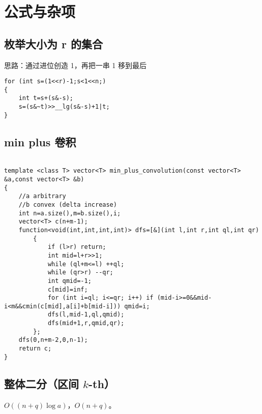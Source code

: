 \documentclass[12pt]{ctexart}
\begin{document}
\newpage

\section{公式与杂项}

\subsection{枚举大小为 r 的集合}

思路：通过进位创造 1，再把一串 1 移到最后

\begin{lstlisting}
for (int s=(1<<r)-1;s<1<<n;)
{
	int t=s+(s&-s);
	s=(s&~t)>>__lg(s&-s)+1|t;
}
\end{lstlisting}
\subsection{min plus 卷积}


\begin{lstlisting}

template <class T> vector<T> min_plus_convolution(const vector<T> &a,const vector<T> &b)
{
	//a arbitrary
	//b convex (delta increase)
	int n=a.size(),m=b.size(),i;
	vector<T> c(n+m-1);
	function<void(int,int,int,int)> dfs=[&](int l,int r,int ql,int qr)
		{
			if (l>r) return;
			int mid=l+r>>1;
			while (ql+m<=l) ++ql;
			while (qr>r) --qr;
			int qmid=-1;
			c[mid]=inf;
			for (int i=ql; i<=qr; i++) if (mid-i>=0&&mid-i<m&&cmin(c[mid],a[i]+b[mid-i])) qmid=i;
			dfs(l,mid-1,ql,qmid);
			dfs(mid+1,r,qmid,qr);
		};
	dfs(0,n+m-2,0,n-1);
	return c;
}

\end{lstlisting}
\subsection{整体二分（区间 $k$-th）}

$O((n+q)\log a)$，$O(n+q)$。
\end{document}
